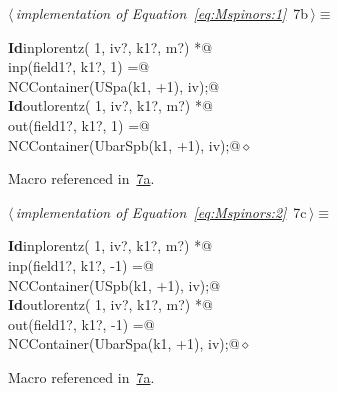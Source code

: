\documentclass[a4paper,12pt]{amsart}
\renewcommand{\NWtarget}[2]{\hypertarget{#1}{#2}}
\renewcommand{\NWlink}[2]{\hyperlink{#1}{#2}}
\renewcommand{\NWtxtMacroRefIn}{Macro referenced in}
\renewcommand{\NWsep}{${\diamond}$}
\begin{document}
\begin{flushleft} \small
\begin{minipage}{\linewidth}\label{scrap14}\raggedright\small
\NWtarget{nuweb7b}{} $\langle\,${\itshape implementation of Equation~\eqref{eq:Mspinors:1}}\nobreak\ {\footnotesize {7b}}$\,\rangle\equiv$
\vspace{-1ex}
\begin{list}{}{} \item
\mbox{}\verb@@\hbox{\sffamily\bfseries Id}\verb@ inplorentz( 1, iv?, k1?, m?) *@\\
\mbox{}\verb@      inp(field1?, k1?,  1) =@\\
\mbox{}\verb@   NCContainer(USpa(k1, +1), iv);@\\
\mbox{}\verb@@\hbox{\sffamily\bfseries Id}\verb@ outlorentz( 1, iv?, k1?, m?) *@\\
\mbox{}\verb@      out(field1?, k1?,  1) =@\\
\mbox{}\verb@   NCContainer(UbarSpb(k1, +1), iv);@{\NWsep}
\end{list}
\vspace{-1.5ex}
\footnotesize
\begin{list}{}{\setlength{\itemsep}{-\parsep}\setlength{\itemindent}{-\leftmargin}}
\item \NWtxtMacroRefIn\ \NWlink{nuweb7a}{7a}.

\item{}
\end{list}
\end{minipage}\vspace{4ex}
\end{flushleft}
\begin{flushleft} \small
\begin{minipage}{\linewidth}\label{scrap15}\raggedright\small
\NWtarget{nuweb7c}{} $\langle\,${\itshape implementation of Equation~\eqref{eq:Mspinors:2}}\nobreak\ {\footnotesize {7c}}$\,\rangle\equiv$
\vspace{-1ex}
\begin{list}{}{} \item
\mbox{}\verb@@\hbox{\sffamily\bfseries Id}\verb@ inplorentz( 1, iv?, k1?, m?) *@\\
\mbox{}\verb@      inp(field1?, k1?, -1) =@\\
\mbox{}\verb@   NCContainer(USpb(k1, +1), iv);@\\
\mbox{}\verb@@\hbox{\sffamily\bfseries Id}\verb@ outlorentz( 1, iv?, k1?, m?) *@\\
\mbox{}\verb@      out(field1?, k1?, -1) =@\\
\mbox{}\verb@   NCContainer(UbarSpa(k1, +1), iv);@{\NWsep}
\end{list}
\vspace{-1.5ex}
\footnotesize
\begin{list}{}{\setlength{\itemsep}{-\parsep}\setlength{\itemindent}{-\leftmargin}}
\item \NWtxtMacroRefIn\ \NWlink{nuweb7a}{7a}.

\item{}
\end{list}
\end{minipage}\vspace{4ex}
\end{flushleft}
\end{document}

